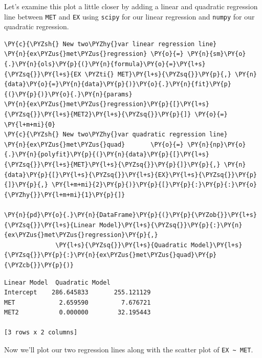 \documentclass[10pt]{article}\usepackage[]{graphicx}\usepackage[]{xcolor}
\begin{document}
    Let's examine this plot a little closer by adding a linear and quadratic regression line between \texttt{MET} and
    \texttt{EX} using \texttt{scipy} for our linear regression and \texttt{numpy} for our quadratic regression.

    \begin{Verbatim}[commandchars=\\\{\}]
\PY{c}{\PYZsh{} New two\PYZhy{}var linear regression line}
\PY{n}{ex\PYZus{}met\PYZus{}regression} \PY{o}{=} \PY{n}{sm}\PY{o}{.}\PY{n}{ols}\PY{p}{(}\PY{n}{formula}\PY{o}{=}\PY{l+s}{\PYZsq{}}\PY{l+s}{EX \PYZti{} MET}\PY{l+s}{\PYZsq{}}\PY{p}{,} \PY{n}{data}\PY{o}{=}\PY{n}{data}\PY{p}{)}\PY{o}{.}\PY{n}{fit}\PY{p}{(}\PY{p}{)}\PY{o}{.}\PY{n}{params}
\PY{n}{ex\PYZus{}met\PYZus{}regression}\PY{p}{[}\PY{l+s}{\PYZsq{}}\PY{l+s}{MET2}\PY{l+s}{\PYZsq{}}\PY{p}{]} \PY{o}{=} \PY{l+m+mi}{0}
\PY{c}{\PYZsh{} New two\PYZhy{}var quadratic regression line}
\PY{n}{ex\PYZus{}met\PYZus{}quad}       \PY{o}{=} \PY{n}{np}\PY{o}{.}\PY{n}{polyfit}\PY{p}{(}\PY{n}{data}\PY{p}{[}\PY{l+s}{\PYZsq{}}\PY{l+s}{MET}\PY{l+s}{\PYZsq{}}\PY{p}{]}\PY{p}{,} \PY{n}{data}\PY{p}{[}\PY{l+s}{\PYZsq{}}\PY{l+s}{EX}\PY{l+s}{\PYZsq{}}\PY{p}{]}\PY{p}{,} \PY{l+m+mi}{2}\PY{p}{)}\PY{p}{[}\PY{p}{:}\PY{p}{:}\PY{o}{\PYZhy{}}\PY{l+m+mi}{1}\PY{p}{]}

\PY{n}{pd}\PY{o}{.}\PY{n}{DataFrame}\PY{p}{(}\PY{p}{\PYZob{}}\PY{l+s}{\PYZsq{}}\PY{l+s}{Linear Model}\PY{l+s}{\PYZsq{}}\PY{p}{:}\PY{n}{ex\PYZus{}met\PYZus{}regression}\PY{p}{,}
              \PY{l+s}{\PYZsq{}}\PY{l+s}{Quadratic Model}\PY{l+s}{\PYZsq{}}\PY{p}{:}\PY{n}{ex\PYZus{}met\PYZus{}quad}\PY{p}{\PYZcb{}}\PY{p}{)}
\end{Verbatim}

\begin{Verbatim}[commandchars=\\\{\}]
Linear Model  Quadratic Model
Intercept    286.645833       255.121129
MET            2.659590         7.676721
MET2           0.000000        32.195443

[3 rows x 2 columns]
\end{Verbatim}

    Now we'll plot our two regression lines along with the scatter plot of \texttt{EX \textasciitilde{} MET}.
\end{document}
